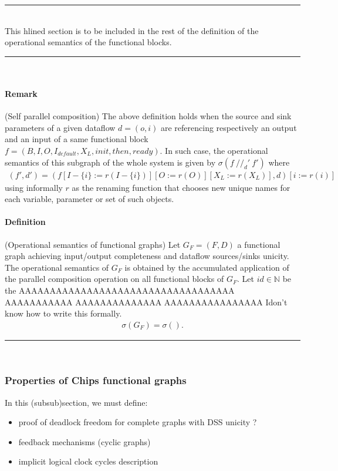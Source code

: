\documentclass{article}
\newcommand{\myrule}{\par\noindent\rule[-1pt]{0.5\textwidth}{0.4pt}\\}
\begin{document}
\myrule
This hlined section is to be included in the rest of the definition of the operational semantics of the functional blocks.
\myrule

\paragraph{Remark} (Self parallel composition) The above definition holds when the source and sink parameters of a given dataflow $d = (o,i)$ are referencing respectively an output and an input of a same functional block $f = (B, I, O, I_{default},X_L, init, then, ready)$. In such case, the operational semantics of this subgraph of the whole system is given by $\sigma(f ~//_d'~ f')$ where 
\begin{align*}
    (f',d') = (f[I-\{i\}:=r(I-\{i\})][O:=r(O)][X_L:=r(X_L)], d)[i:=r(i)]
\end{align*}
using informally $r$ as the renaming function that chooses new unique names for each variable, parameter or set of such objects.

\paragraph{Definition} (Operational semantics of functional graphs) Let $G_F = (F, D)$ a functional graph achieving input/output completeness and dataflow sources/sinks unicity. The operational semantics of $G_F$ is obtained by the accumulated application of the parallel composition operation on all functional blocks of $G_F$. Let $id \in \mathbb{N}$ be the AAAAAAAAAAAAAAAAAAAAAAAAAAAAAAAAAAA AAAAAAAAAAA AAAAAAAAAAAAAA AAAAAAAAAAAAAAAA Idon't know how to write this formally.
\begin{align}
    \sigma(G_F) = \sigma().
\end{align}

\myrule

\subsubsection{Properties of Chips functional graphs}

In this (subsub)section, we must define:
\begin{itemize}
    \item proof of deadlock freedom for complete graphs with DSS unicity ? 
    \item feedback mechanisms (cyclic graphs)
    \item implicit logical clock cycles description
\end{itemize}
\end{document}
